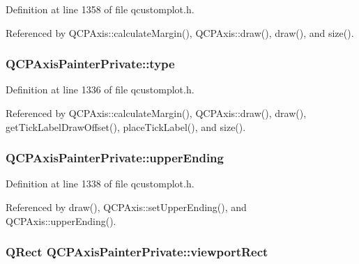 Definition at line 1358 of file qcustomplot.\+h.



Referenced by Q\+C\+P\+Axis\+::calculate\+Margin(), Q\+C\+P\+Axis\+::draw(), draw(), and size().

\hypertarget{class_q_c_p_axis_painter_private_ae04594e97417336933d807c86d353098}{}
\subsubsection[{type}]{ Q\+C\+P\+Axis\+Painter\+Private\+::type}\label{class_q_c_p_axis_painter_private_ae04594e97417336933d807c86d353098}


Definition at line 1336 of file qcustomplot.\+h.



Referenced by Q\+C\+P\+Axis\+::calculate\+Margin(), Q\+C\+P\+Axis\+::draw(), draw(), get\+Tick\+Label\+Draw\+Offset(), place\+Tick\+Label(), and size().

\hypertarget{class_q_c_p_axis_painter_private_af764be913be5f924700ac9bbb8c01139}{}
\subsubsection[{upper\+Ending}]{ Q\+C\+P\+Axis\+Painter\+Private\+::upper\+Ending}\label{class_q_c_p_axis_painter_private_af764be913be5f924700ac9bbb8c01139}


Definition at line 1338 of file qcustomplot.\+h.



Referenced by draw(), Q\+C\+P\+Axis\+::set\+Upper\+Ending(), and Q\+C\+P\+Axis\+::upper\+Ending().

\hypertarget{class_q_c_p_axis_painter_private_a8627dc6b40781e3291bb508e4ac574d6}{}
\subsubsection[{viewport\+Rect}]{\setlength{\rightskip}{0pt plus 5cm}Q\+Rect Q\+C\+P\+Axis\+Painter\+Private\+::viewport\+Rect}\label{class_q_c_p_axis_painter_private_a8627dc6b40781e3291bb508e4ac574d6}


